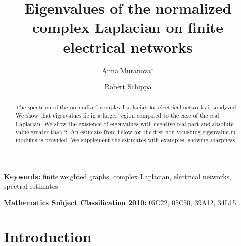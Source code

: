 \documentclass[a4paper,11pt]{amsart}
\author[Anna Muranova]{Anna Muranova*}
\author[Robert Schippa]{Robert Schippa}
\title[Complex Laplacian]{Eigenvalues of the normalized complex Laplacian on finite electrical networks}
\theoremstyle{definition}
\begin{document}
                         
\maketitle







\begin{abstract}
The spectrum of the normalized complex Laplacian for electrical networks is analyzed. We show that eigenvalues lie in a larger region compared to the case of the real Laplacian. We show the existence of eigenvalues with negative real part and absolute value greater than $2$. An estimate from below for the first non-vanishing eigenvalue in modulus is provided. We supplement the estimates with examples, showing sharpness.
\end{abstract}

{\footnotesize
{\bf Keywords:} {finite weighted graphs, complex Laplacian, electrical networks, spectral estimates} 
\smallskip

{\bf Mathematics Subject Classification 2010:}{ 05C22, 05C50, 39A12, 34L15} 
}


\section{Introduction}
\end{document}

